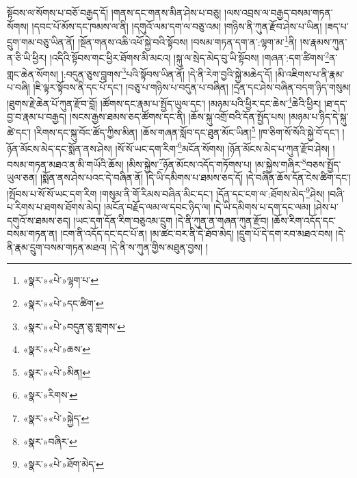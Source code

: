 སྟོབས་ལ་སོགས་པ་བཅོ་བརྒྱད་དོ། །གནས་དང་གནས་མིན་ཤེས་པ་བཅུ། །ལས་འབྲས་ལ་བརྒྱད་བསམ་གཏན་སོགས། །དབང་པོ་མོས་དང་ཁམས་ལ་ནི། །དགུའོ་ལམ་དག་ལ་བཅུ་འམ། །གཉིས་ནི་ཀུན་རྫོབ་ཤེས་པ་ཡིན། །ཟད་པ་དྲུག་གམ་བཅུ་ཡིན་ནོ། །སྔོན་གནས་འཆི་འཕོ་སྐྱེ་བའི་སྟོབས། །བསམ་གཏན་དག་ན་:ལྷག་མ་\footnote{«སྣར་»«པེ་»ལྷག་པ་}ནི། །ས་རྣམས་ཀུན་ན་ཅི་ཡི་ཕྱིར། །འདིའི་སྟོབས་གང་ཕྱིར་ཐོགས་མི་མངའ། །སྐུ་ལ་སྲེད་མེད་བུ་ཡི་སྟོབས། །གཞན་:དག་ཚིགས་\footnote{«སྣར་»«པེ་»དང་ཚིག་}ན་གླང་ཆེན་སོགས། །:བདུན་ཅུས་བླགས་\footnote{«སྣར་»«པེ་»བདུན་ཅུ་གླགས་}པའི་སྟོབས་ཡིན་ནོ། །དེ་ནི་རེག་བྱའི་སྐྱེ་མཆེད་དོ། །མི་འཇིགས་པ་ནི་རྣམ་པ་བཞི། །ཇི་ལྟར་སྟོབས་ནི་དང་པོ་དང་། །བཅུ་པ་གཉིས་པ་བདུན་པ་བཞིན། །དྲན་དང་ཤེས་བཞིན་བདག་ཉིད་གསུམ། །ཐུགས་རྗེ་ཆེན་པོ་ཀུན་རྫོབ་བློ། །ཚོགས་དང་རྣམ་པ་སྤྱོད་ཡུལ་དང་། །མཉམ་པའི་ཕྱིར་དང་ཆེས་\footnote{«སྣར་»«པེ་»ཆས་}ཆེའི་ཕྱིར། །ཐ་དད་བྱ་བ་རྣམ་པ་བརྒྱད། །སངས་རྒྱས་ཐམས་ཅད་ཚོགས་དང་ནི། །ཆོས་སྐུ་འགྲོ་བའི་དོན་སྤྱོད་པས། །མཉམ་པ་ཉིད་དེ་སྐུ་ཚེ་དང་། །རིགས་དང་སྐུ་བོང་ཚོད་ཀྱིས་མིན། །ཆོས་གཞན་སློབ་དང་ཐུན་མོང་ཡིན།\footnote{«སྣར་»«པེ་»མིན།} །ཁ་ཅིག་སོ་སོའི་སྐྱེ་བོ་དང་། །ཉོན་མོངས་མེད་དང་སྨོན་ནས་ཤེས། །སོ་སོ་ཡང་དག་རིག་\footnote{«སྣར་»རིགས་}མངོན་སོགས། །ཉོན་མོངས་མེད་པ་ཀུན་རྫོབ་ཤེས། །བསམ་གཏན་མཐའ་ན་མི་གཡོའི་ཆོས། །མིས་སྐྱེས་\footnote{«སྣར་»«པེ་»སྐྱེད་}ཉོན་མོངས་འདོད་གཏོགས་པ། །མ་སྐྱེས་གཞིར་\footnote{«སྣར་»བཞིར་}བཅས་སྤྱོད་ཡུལ་ཅན། །སྨོན་ནས་ཤེས་པའང་དེ་བཞིན་ནོ། །དེ་ཡི་དམིགས་པ་ཐམས་ཅད་དོ། །དེ་བཞིན་ཆོས་དོན་ངེས་ཚིག་དང་། །སྤོབས་པ་སོ་སོ་ཡང་དག་རིག །གསུམ་ནི་གོ་རིམས་བཞིན་མིང་དང་། །དོན་དང་ངག་ལ་:ཐོགས་མེད་\footnote{«སྣར་»«པེ་»ཐོག་མེད་}ཤེས། །བཞི་པ་རིགས་པ་ཐགས་ཐོགས་མེད། །མངོན་བརྗོད་ལམ་ལ་དབང་ཉིད་ལ། །དེ་ཡི་དམིགས་པ་དག་དང་ལམ། །ཤེས་པ་དགུའོ་ས་ཐམས་ཅད། །ཡང་དག་དོན་རིག་བཅུའམ་དྲུག །དེ་ནི་ཀུན་ན་གཞན་ཀུན་རྫོབ། །ཆོས་རིག་འདོད་དང་བསམ་གཏན་ན། །ངག་ནི་འདོད་དང་དང་པོ་ན། །མ་ཚང་བར་ནི་དེ་ཐོབ་མེད། །དྲུག་པོ་དེ་དག་རབ་མཐའ་བས། །དེ་ནི་རྣམ་དྲུག་བསམ་གཏན་མཐའ། །དེ་ནི་ས་ཀུན་གྱིས་མཐུན་བྱས། །
